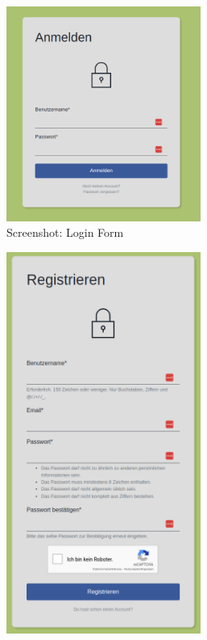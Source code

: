 \begin{figure}[htp]
    \begin{subfigure}[b]{0.32\textwidth}
        \centering
        \includegraphics[width=0.7\textwidth]{images/Auth1.png}
        \caption{Screenshot: Login Form}
        \label{fig:r-login}
    \end{subfigure}
    \begin{subfigure}[b]{0.32\textwidth}
        \centering
        \includegraphics[width=0.7\textwidth]{images/Auth2.png}

\end{subfigure}
\end{figure}
